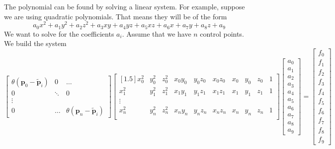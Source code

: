 \documentclass{article}
\begin{document}
The polynomial can be found by solving a linear system. For example, suppose we
are using quadratic polynomials. That means they will be of the form
\[
    a_0 x^2 + a_1 y^2 + a_2 z^2 + a_3 xy + a_4 yz + a_5 xz + a_6 x
    + a_7 y + a_8 z + a_9
\]
We want to solve for the coefficients $a_i$. Assume that we have $n$ control
points. We build the system
\[
    \begin{bmatrix}
        \theta(\mathbf{p}_0 - \mathbf{\tilde{p}}_i) & 0 & \ldots \\
        0 & \ddots & 0 \\
        \vdots \\
        0 & \ldots & \theta(\mathbf{p}_n - \mathbf{\tilde{p}}_i)
    \end{bmatrix}
    \begin{bmatrix}[1.5]
        x_0^2 & y_0^2 & z_0^2 & x_0 y_0 & y_0 z_0 & x_0 z_0 & x_0 & y_0 & z_0 & 1 \\
        x_1^2 & y_1^2 & z_1^2 & x_1 y_1 & y_1 z_1 & x_1 z_1 & x_1 & y_1 & z_1 & 1 \\
        \vdots \\
        x_n^2 & y_n^2 & z_n^2 & x_n y_n & y_n z_n & x_n z_n & x_n & y_n & z_n & 1 \\
    \end{bmatrix}
    \begin{bmatrix}
        a_0 \\
        a_1 \\
        a_2 \\
        a_3 \\
        a_4 \\
        a_5 \\
        a_6 \\
        a_7 \\
        a_8 \\
        a_9
    \end{bmatrix}
    =
    \begin{bmatrix}
        f_0 \\
        f_1 \\
        f_2 \\
        f_3 \\
        f_4 \\
        f_5 \\
        f_6 \\
        f_7 \\
        f_8 \\
        f_9
    \end{bmatrix}
\]
\end{document}
